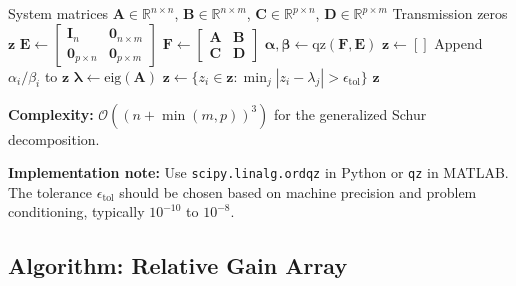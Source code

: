 \begin{algorithm}[H]
\caption{Transmission Zero Computation via Generalized Eigenvalues}
\label{alg:transmission_zeros}
\begin{algorithmic}[1]
\REQUIRE System matrices $\mathbf{A} \in \mathbb{R}^{n \times n}$, $\mathbf{B} \in \mathbb{R}^{n \times m}$, $\mathbf{C} \in \mathbb{R}^{p \times n}$, $\mathbf{D} \in \mathbb{R}^{p \times m}$
\ENSURE Transmission zeros $\mathbf{z}$
\STATE
{}
\STATE $\mathbf{E} \gets \begin{bmatrix} \mathbf{I}_n & \mathbf{0}_{n \times m} \\ \mathbf{0}_{p \times n} & \mathbf{0}_{p \times m} \end{bmatrix}$
\STATE $\mathbf{F} \gets \begin{bmatrix} \mathbf{A} & \mathbf{B} \\ \mathbf{C} & \mathbf{D} \end{bmatrix}$
\STATE
{}
\STATE $\boldsymbol{\alpha}, \boldsymbol{\beta} \gets \text{qz}(\mathbf{F}, \mathbf{E})$ 
\STATE
{}
\STATE $\mathbf{z} \gets []$
     
        \STATE Append $\alpha_i / \beta_i$ to $\mathbf{z}$
    \ENDIF
\ENDFOR
\STATE
{}
\STATE $\boldsymbol{\lambda} \gets \text{eig}(\mathbf{A})$
\STATE $\mathbf{z} \gets \{z_i \in \mathbf{z} : \min_j |z_i - \lambda_j| > \epsilon_{\text{tol}}\}$
\STATE
\RETURN $\mathbf{z}$
\end{algorithmic}
\end{algorithm}

\textbf{Complexity:} $\mathcal{O}((n+\min(m,p))^3)$ for the generalized Schur decomposition.

\textbf{Implementation note:} Use \texttt{scipy.linalg.ordqz} in Python or \texttt{qz} in MATLAB. The tolerance $\epsilon_{\text{tol}}$ should be chosen based on machine precision and problem conditioning, typically $10^{-10}$ to $10^{-8}$.


\subsection{Algorithm: Relative Gain Array}

